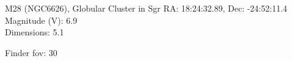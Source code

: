 \begin{block}{M28 (NGC6626), Globular Cluster in Sgr}
    RA: 18:24:32.89, Dec: -24:52:11.4 \\ 
    Magnitude (V): 6.9 \\ 
    Dimensions: 5.1 

    Finder fov: 30 
\end{block}